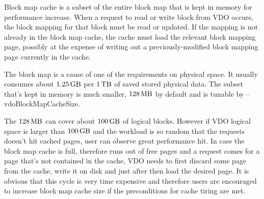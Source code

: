 \documentclass[
  color, %
  table, %
  lof,   %
  lot,   %
]{fithesis3}
\begin{document}
Block map cache is a subset of the entire block map that is kept in memory for performance increase. When a request to read or write block from VDO occurs, the block mapping for that block must be read or updated. If the mapping is not already in the block map cache, the cache must load the relevant block mapping page, possibly at the expense of writing out a previously-modified block mapping page currently in the cache.



The block map is a cause of one of the requirements on physical space. It usually consumes about $\SI{1,25}{\giga\byte}$ per $\SI{1}{\tera\byte}$ of saved stored physical data. The subset that's kept in memory is much smaller, $\SI{128}{\mega\byte}$ by default and is tunable by --vdoBlockMapCacheSize.

The $\SI{128}{\mega\byte}$ can cover about $\SI{100}{\giga\byte}$ of logical blocks. However if VDO logical space is larger than $\SI{100}{\giga\byte}$ and the workload is so random that the requests doesn't hit cached pages, user can observe great performance hit. In case the block map cache is full, therefore runs out of free pages and a request comes for a page that's not contained in the cache, VDO needs to first discard some page from the cache, write it on disk and just after then load the desired page. It is obvious that this cycle is very time expensive and therefore users are encouraged to increase block map cache size if the preconditions for cache tiring are met.






\end{document}
